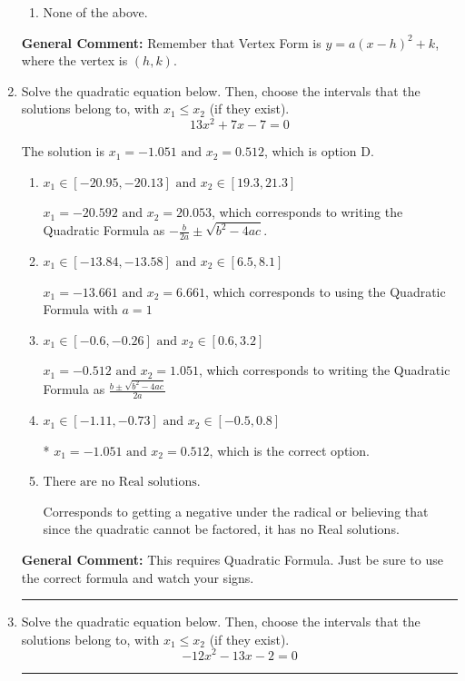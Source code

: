\documentclass{extbook}[14pt]
\newcommand{\litem}[1]{\item #1

\rule{\textwidth}{0.4pt}}
\begin{document}
\begin{enumerate}
{\begin{enumerate}[label=\Alph*.]
\item None of the above.\end{enumerate}
\textbf{General Comment:} Remember that Vertex Form is $y = a(x-h)^2+k$, where the vertex is $(h, k)$.
}
\litem{
Solve the quadratic equation below. Then, choose the intervals that the solutions belong to, with $x_1 \leq x_2$ (if they exist).
\[ 13x^{2} +7 x -7 = 0 \]

The solution is \( x_1 = -1.051 \text{ and } x_2 = 0.512 \), which is option D.\begin{enumerate}[label=\Alph*.]
\item \( x_1 \in [-20.95, -20.13] \text{ and } x_2 \in [19.3, 21.3] \)

 $x_1 = -20.592 \text{ and } x_2 = 20.053$, which corresponds to writing the Quadratic Formula as $-\frac{b}{2a} \pm \sqrt{b^2 - 4ac}$.
\item \( x_1 \in [-13.84, -13.58] \text{ and } x_2 \in [6.5, 8.1] \)

 $x_1 = -13.661 \text{ and } x_2 = 6.661$, which corresponds to using the Quadratic Formula with $a=1$
\item \( x_1 \in [-0.6, -0.26] \text{ and } x_2 \in [0.6, 3.2] \)

 $x_1 = -0.512 \text{ and } x_2 = 1.051$, which corresponds to writing the Quadratic Formula as $\frac{b \pm \sqrt{b^2 - 4ac}}{2a}$
\item \( x_1 \in [-1.11, -0.73] \text{ and } x_2 \in [-0.5, 0.8] \)

* $x_1 = -1.051 \text{ and } x_2 = 0.512$, which is the correct option.
\item \( \text{There are no Real solutions.} \)

Corresponds to getting a negative under the radical or believing that since the quadratic cannot be factored, it has no Real solutions.
\end{enumerate}

\textbf{General Comment:} This requires Quadratic Formula. Just be sure to use the correct formula and watch your signs.
}
\litem{
Solve the quadratic equation below. Then, choose the intervals that the solutions belong to, with $x_1 \leq x_2$ (if they exist).
\[ -12x^{2} -13 x -2 = 0 \]

}
\end{enumerate}
\end{document}
